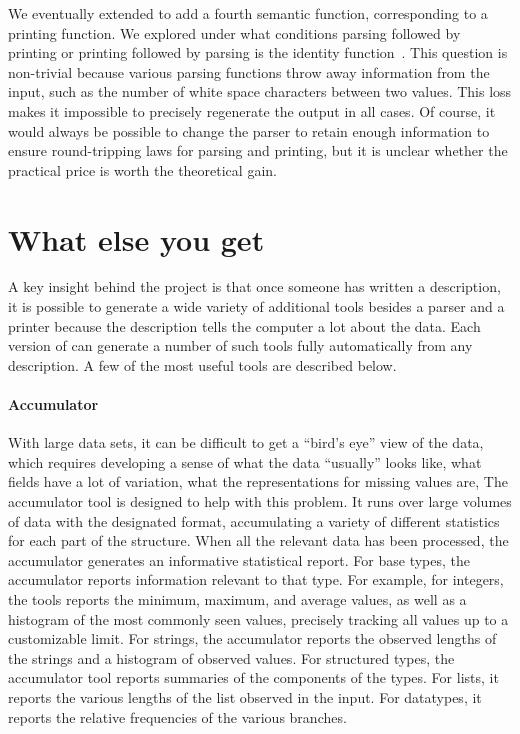 \documentclass{sig-alternate}
\begin{document}
We eventually extended \ddca{} to add a fourth semantic function,
corresponding to a printing function.  We explored under what
conditions parsing followed by printing or printing followed by
parsing is the identity function~\cite{fisher+:ddc-printing}.  This
question is non-trivial because various parsing functions throw away
information from the input, such as the number of white space
characters between two values.  This loss makes it impossible to
precisely regenerate the output in all cases.  Of course, it would always 
be possible to change
the parser to retain enough information to ensure round-tripping laws for
parsing and printing, but it is unclear whether the practical price is worth the theoretical
gain.



\section{What else you get}
\label{sec:tools}
A key insight behind the \pads{} project is that once someone has
written a description, it is possible to generate a wide variety of
additional tools besides a parser and a printer because the description
tells the computer a lot about the data.  Each version of \pads{}
can generate a number of such tools fully automatically from any
description.  A few of the most useful tools are described below.


\paragraph{Accumulator} With large data sets, it can be difficult to get a
  ``bird's eye'' view of the data, which requires developing a sense
  of what the data ``usually'' looks like, what fields have a lot of
  variation, what the representations for missing values are, \etc{} 
  The accumulator tool is designed to help with this problem.  
  It runs over large volumes of data with the designated format,
  accumulating a variety of different statistics for each part of the
  structure.  When all the relevant data has been
  processed, the accumulator generates an informative statistical report.
  For base types, the accumulator reports
  information relevant to that type.  For example, for integers, the
  tools reports the minimum, maximum, and average values, as well as a
  histogram of the most commonly seen values, precisely tracking all
  values up to a customizable limit.  For strings, the accumulator
  reports the observed lengths of the strings and a histogram of
  observed values.  For structured types, the accumulator tool reports
  summaries of the components of the types.  For lists, it reports the
  various lengths of the list observed in the input.  For datatypes,
  it reports the relative frequencies of the various branches.  
\end{document}
